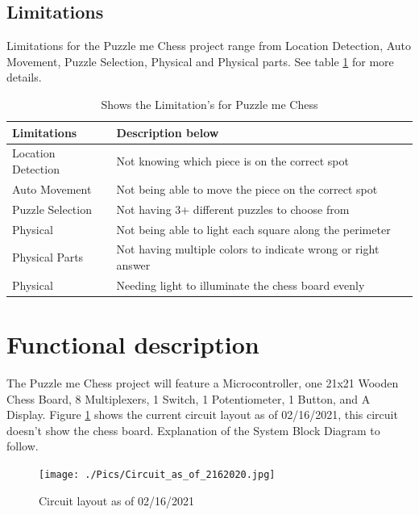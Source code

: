 \documentclass[11pt]{article}
\begin{document}
 \newpage 
 
\subsection{Limitations}
Limitations for the Puzzle me Chess project range from Location Detection, Auto Movement, Puzzle Selection, Physical and Physical parts. See table \ref{tab:limitations} for more details.

\begin{table}
\begin{center}
    \begin{tabular}{| l | l |}
    \hline
    Limitations  & Description below\\ \hline
    Location Detection & Not knowing which piece is on the correct spot \\ \hline
    Auto Movement & Not being able to move the piece on the correct spot \\ \hline 
    Puzzle Selection & Not having 3+ different puzzles to choose from  \\ \hline
    Physical & Not being able to light each square along the perimeter  \\ \hline
    Physical Parts & Not having multiple colors to indicate wrong or right answer \\ \hline
    Physical & Needing light to illuminate the chess board evenly \\ \hline
    \end{tabular}
    \caption{Shows the Limitation's for Puzzle me Chess}
	\label{tab:limitations}
\end{center}
\end{table}

\section{Functional description}
The Puzzle me Chess project will feature a Microcontroller, one 21x21 Wooden Chess Board, 8 Multiplexers, 1 Switch, 1 Potentiometer, 1 Button, and A Display. Figure \ref{fig:Circuit} shows  the current circuit layout as of 02/16/2021, this circuit doesn't show the chess board. Explanation of the System Block Diagram to follow.

\begin{figure}
  \texttt{[image: ./Pics/Circuit\_as\_of\_2162020.jpg]}
  \caption{Circuit layout as of 02/16/2021}
  \label{fig:Circuit}
\end{figure}
\end{document}
